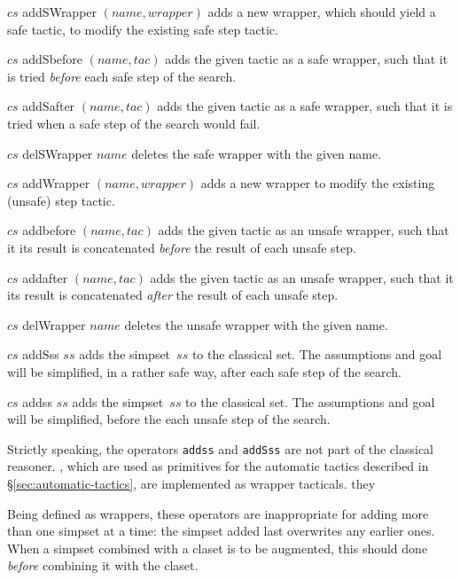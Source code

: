 \begin{ttdescription}
\item[$cs$ addSWrapper $(name,wrapper)$] 
adds a new wrapper, which should yield a safe tactic, 
to modify the existing safe step tactic.

\item[$cs$ addSbefore $(name,tac)$] 
adds the given tactic as a safe wrapper, such that it is tried 
{\em before} each safe step of the search.

\item[$cs$ addSafter $(name,tac)$] 
adds the given tactic as a safe wrapper, such that it is tried 
when a safe step of the search would fail.

\item[$cs$ delSWrapper $name$] 
deletes the safe wrapper with the given name.

\item[$cs$ addWrapper $(name,wrapper)$] 
adds a new wrapper to modify the existing (unsafe) step tactic.

\item[$cs$ addbefore $(name,tac)$] 
adds the given tactic as an unsafe wrapper, such that it its result is 
concatenated {\em before} the result of each unsafe step.

\item[$cs$ addafter $(name,tac)$] 
adds the given tactic as an unsafe wrapper, such that it its result is 
concatenated {\em after} the result of each unsafe step.

\item[$cs$ delWrapper $name$] 
deletes the unsafe wrapper with the given name.

\item[$cs$ addSss $ss$] 
adds the simpset~$ss$ to the classical set.  The assumptions and goal will be
simplified, in a rather safe way, after each safe step of the search.

\item[$cs$ addss $ss$] 
adds the simpset~$ss$ to the classical set.  The assumptions and goal will be
simplified, before the each unsafe step of the search.

\end{ttdescription}

Strictly speaking, the operators \texttt{addss} and \texttt{addSss}
are not part of the classical reasoner.
, which are used as primitives 
for the automatic tactics described in {\S}\ref{sec:automatic-tactics}, are
implemented as wrapper tacticals.
they  
\begin{warn}
Being defined as wrappers, these operators are inappropriate for adding more 
than one simpset at a time: the simpset added last overwrites any earlier ones.
When a simpset combined with a claset is to be augmented, this should done 
{\em before} combining it with the claset.
\end{warn}


